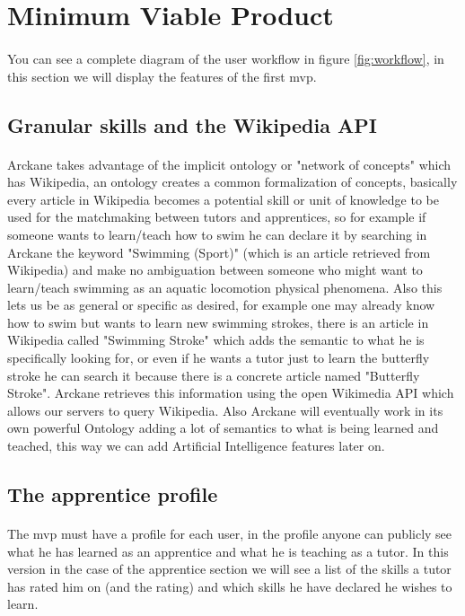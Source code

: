 \section{Minimum Viable Product}

\paragraph{} You can see a complete diagram of the user workflow in figure \ref{fig:workflow}, in this section we will display the features of the first mvp.

\subsection{Granular skills and the Wikipedia API}
\paragraph{} Arckane takes advantage of the implicit ontology or "network of concepts" which has Wikipedia, an ontology creates a common formalization of concepts, basically every article in Wikipedia becomes a potential skill or unit of knowledge to be used for the matchmaking between tutors and apprentices, so for example if someone wants to learn/teach how to swim he can declare it by searching in Arckane the keyword "Swimming (Sport)" (which is an article retrieved from Wikipedia) and make no ambiguation between someone who might want to learn/teach swimming as an aquatic locomotion physical phenomena. Also this lets us be as general or specific as desired, for example one may already know how to swim but wants to learn new swimming strokes, there is an article in Wikipedia called "Swimming Stroke" which adds the semantic to what he is specifically looking for, or even if he wants a tutor just to learn the butterfly stroke he can search it because there is a concrete article named "Butterfly Stroke". Arckane retrieves this information using the open Wikimedia API which allows our servers to query Wikipedia. Also Arckane will eventually work in its own powerful Ontology adding a lot of semantics to what is being learned and teached, this way we can add Artificial Intelligence features later on.

\subsection{The apprentice profile}
\paragraph{} The mvp must have a profile for each user, in the profile anyone can publicly see what he has learned as an apprentice and what he is teaching as a tutor. In this version in the case of the apprentice section we will see a list of the skills a tutor has rated him on (and the rating) and which skills he have declared he wishes to learn.

